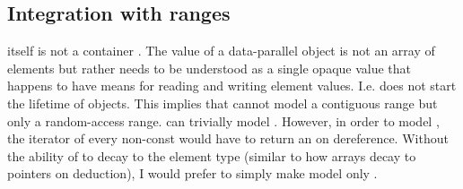 %
%
%
%
\subsection{Integration with ranges}\label{sec:ranges}
 itself is not a container \cite{P0851R0}.
The value of a data-parallel object is not an array of elements but rather needs to be understood as a single opaque value that happens to have means for reading and writing element values.
I.e.  does not start the lifetime of  objects.
This implies that  cannot model a contiguous range but only a random-access range.
 can trivially model .
However, in order to model , the iterator of every non-const  would have to return an  on dereference.
Without the ability of  to decay to the element type (similar to how arrays decay to pointers on deduction), I would prefer to simply make  model only .

